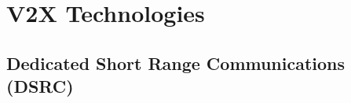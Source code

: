 \newpage

\section{V2X Technologies}
\label{sec:v2xtech}



\subsection{Dedicated Short Range Communications (DSRC)}

